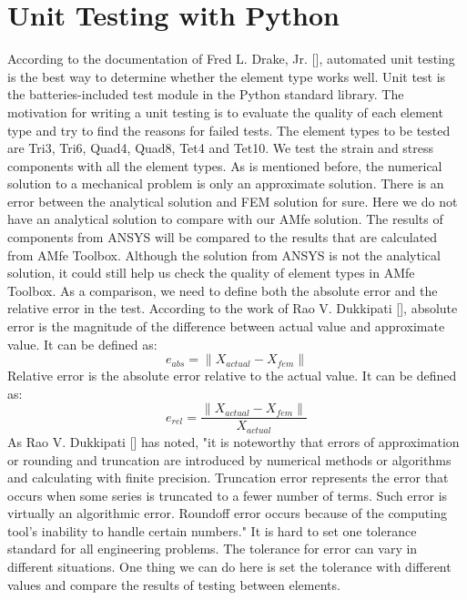 \section{Unit Testing with Python}
According to the documentation of Fred L. Drake, Jr. [\cite{Python}], automated unit testing is the best way to determine whether the element type works well. Unit test is the batteries-included test module in the Python standard library. The motivation for writing a unit testing is to evaluate the quality of each element type and try to find the reasons for failed tests. The element types to be tested are Tri3, Tri6, Quad4, Quad8, Tet4 and Tet10. We test the strain and stress components with all the element types. As is mentioned before, the numerical solution to a mechanical problem is only an approximate solution. There is an error between the analytical solution and FEM solution for sure. Here we do not have an analytical solution to compare with our AMfe solution. The results of components from ANSYS will be compared to the results that are calculated from AMfe Toolbox. Although the solution from ANSYS is not the analytical solution, it could still help us check the quality of element types in AMfe Toolbox. As a comparison, we need to define both the absolute error and the relative error in the test. According to the work of Rao V. Dukkipati [\cite{NumericalMethod}], absolute error is the magnitude of the difference between actual value and approximate value. It can be defined as:
\begin{equation}
e_{abs} = \|X_{actual} - X_{fem} \|
\end{equation}
Relative error is the absolute error relative to the actual value. It can be defined as:
\begin{equation}
e_{rel} = \frac{\|X_{actual} - X_{fem} \|}{X_{actual}}
\end{equation} 
As Rao V. Dukkipati [\cite{NumericalMethod}] has noted, "it is noteworthy that errors of approximation or rounding and truncation are introduced by numerical methods or algorithms and calculating with finite precision. Truncation error represents the error that occurs when some series is truncated to a fewer number of terms. Such error is virtually an algorithmic error. Roundoff error occurs because of the computing tool's inability to handle certain numbers." It is hard to set one tolerance standard for all engineering problems. The tolerance for error can vary in different situations. One thing we can do here is set the tolerance with different values and compare the results of testing between elements. 
